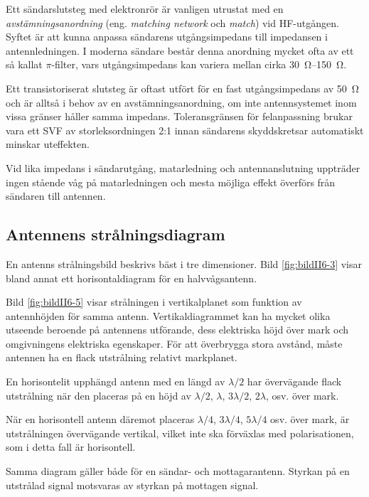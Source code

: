 Ett sändarslutsteg med elektronrör är vanligen utrustat med en
\emph{avstämningsanordning} (eng. \emph{matching network} och \emph{match})
vid HF-utgången.
Syftet är att kunna anpassa sändarens utgångsimpedans till impedansen i
antennledningen.
I moderna sändare består denna anordning mycket ofta av ett så kallat
\(\pi \)-filter, vars utgångsimpedans kan variera mellan cirka
\SIrange{30}{150}{\ohm}.

Ett transistoriserat slutsteg är oftast utfört för en fast utgångsimpedans av
\SI{50}{\ohm} och är alltså i behov av en avstämningsanordning, om inte
antennsystemet inom vissa gränser håller samma impedans.
Toleransgränsen för felanpassning brukar vara ett SVF av storleksordningen 2:1
innan sändarens skyddskretsar automatiskt minskar uteffekten.

Vid lika impedans i sändarutgång, matarledning och antennanslutning
uppträder ingen stående våg på matarledningen och mesta möjliga effekt
överförs från sändaren till antennen.

\subsection{Antennens strålningsdiagram}


En antenns strålningsbild beskrivs bäst i tre dimensioner.
Bild \ref{fig:bildII6-3} visar bland annat ett horisontaldiagram för en
halvvågsantenn.

Bild \ref{fig:bildII6-5} visar strålningen i vertikalplanet som funktion av
antennhöjden för samma antenn.
Vertikaldiagrammet kan ha mycket olika utseende beroende på antennens utförande,
dess elektriska höjd över mark och omgivningens elektriska egenskaper.
För att överbrygga stora avstånd, måste antennen ha en flack utstrålning
relativt markplanet.

En horisontelit upphängd antenn med en längd av \(\lambda/2\) har övervägande
flack utstrålning när den placeras på en höjd av \(\lambda/2\), \(\lambda\),
\(3\lambda/2\), \(2\lambda\), osv. över mark.

När en horisontell antenn däremot placeras \(\lambda/4\), \(3\lambda/4\),
\(5\lambda/4\) osv. över mark, är utstrålningen övervägande vertikal, vilket
inte ska förväxlas med polarisationen, som i detta fall är horisontell.

Samma diagram gäller både för en sändar- och mottagarantenn.
Styrkan på en utstrålad signal motsvaras av styrkan på mottagen signal.

